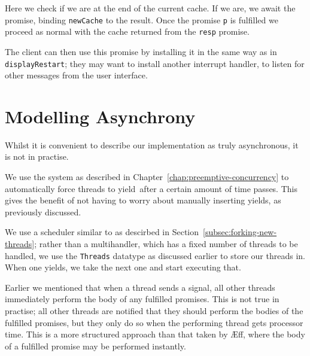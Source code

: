 \documentclass[msc,deptreport,cs]{infthesis} %
\newcommand{\code}[1]{\lstinline{#1}}
\newcommand\aeff{{\AE}ff\xspace}
\newcommand\yield{\textsf{yield}\xspace}
\newcommand{\todo}[1]
           {{\par\noindent\small\color{RoyalPurple}
  \framebox{\parbox{\dimexpr\linewidth-2\fboxsep-2\fboxrule}
    {\textbf{TODO:} #1}}}}
\begin{document}
\noindent Here we check if we are at the end of the current cache. If we are, we
await the promise, binding \code{newCache} to the result. Once the promise
\code{p} is fulfilled we proceed as normal with the cache returned from the
\code{resp} promise.

The client can then use this promise by installing it in the same way as in
\code{displayRestart}; they may want to install another interrupt handler, to
listen for other messages from the user interface.

\section{Modelling Asynchrony}

Whilst it is convenient to describe our implementation as truly asynchronous, it
is not in practise.

\todo{Better opening paragraph}

We use the system as described in Chapter~\ref{chap:preemptive-concurrency} to
automatically force threads to \yield~after a certain amount of time passes.
This gives the benefit of not having to worry about manually inserting yields,
as previously discussed.

We use a scheduler similar to as descirbed in
Section~\ref{subsec:forking-new-threads}; rather than a multihandler, which has
a fixed number of threads to be handled, we use the \code{Threads} datatype as
discussed earlier to store our threads in. When one yields, we take the next one
and start executing that.

Earlier we mentioned that when a thread sends a signal, all other threads
immediately perform the body of any fulfilled promises. This is not true in
practise; all other threads are notified that they should perform the bodies of
the fulfilled promises, but they only do so when the performing thread gets
processor time. This is a more structured approach than that taken by \aeff,
where the body of a fulfilled promise may be performed instantly.


\end{document}
